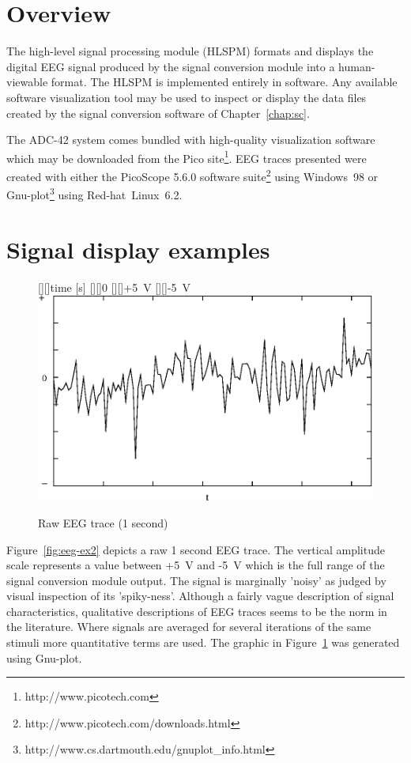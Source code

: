 \section{Overview}

The high-level signal processing module (HLSPM) formats and displays
the digital EEG signal produced by the signal conversion module into a
human-viewable format. The HLSPM is implemented entirely in
software. Any available software visualization tool may be used to
inspect or display the data files created by the signal conversion
software of Chapter~\ref{chap:sc}. 

The ADC-42 system comes bundled with high-quality visualization
software which may be downloaded from the Pico
site\footnote{http://www.picotech.com}. EEG traces presented were
created with either the PicoScope 5.6.0 software
suite\footnote{http://www.picotech.com/downloads.html} using
Windows~98 or
Gnu-plot\footnote{http://www.cs.dartmouth.edu/gnuplot\_info.html} using
Red-hat~Linux~6.2.


\section{Signal display examples}

\begin{figure}[htbp]
	[][]{time [s]}
	[][]{0}
	\psfrag{+}[][]{+5~V}
	\psfrag{-}[][]{-5~V}
	\includegraphics[width=\textwidth]{eeg-ex1.eps} 
	\caption{Raw EEG trace (1 second) }  
	\label{fig:eeg-ex2}
\end{figure}


Figure~\vref{fig:eeg-ex2} depicts a raw 1 second EEG trace. The
vertical amplitude scale represents a value between +5~V and -5~V
which is the full range of the signal conversion module output.  The
signal is marginally 'noisy' as judged by visual inspection of its
'spiky-ness'. Although a fairly vague description of signal
characteristics, qualitative descriptions of EEG traces seems to be
the norm in the literature. Where signals are averaged for several
iterations of the same stimuli more quantitative terms are used. The
graphic in Figure~\ref{fig:eeg-ex2} was generated using Gnu-plot.

